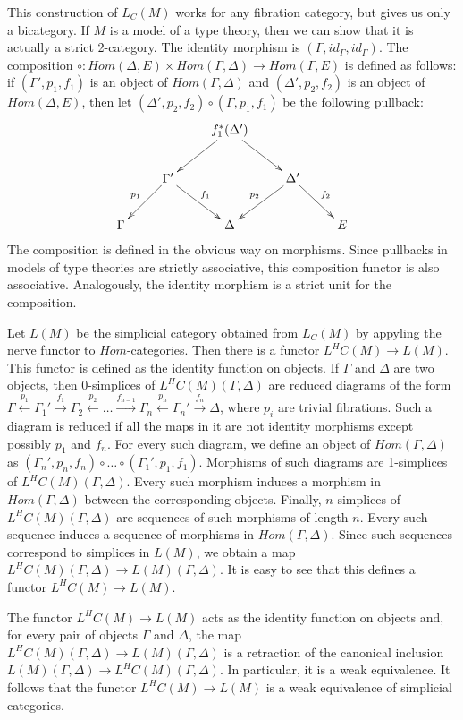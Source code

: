 \documentclass[reqno]{amsart}
\theoremstyle{definition}
\theoremstyle{remark}
\numberwithin{figure}{section}
\begin{document}
This construction of $L_C(M)$ works for any fibration category, but gives us only a bicategory.
If $M$ is a model of a type theory, then we can show that it is actually a strict 2-category.
The identity morphism is $(\Gamma,id_\Gamma,id_\Gamma)$.
The composition $\circ : Hom(\Delta,E) \times Hom(\Gamma,\Delta) \to Hom(\Gamma,E)$ is defined as follows:
if $(\Gamma',p_1,f_1)$ is an object of $Hom(\Gamma,\Delta)$ and $(\Delta',p_2,f_2)$ is an object of $Hom(\Delta,E)$,
then let $(\Delta',p_2,f_2) \circ (\Gamma,p_1,f_1)$ be the following pullback:
\[ \xymatrix{        &                                     & f_1^*(\Delta') \ar[dl] \ar[dr] &                                     & \\
                     & \Gamma' \ar[dl]_{p_1} \ar[dr]^{f_1} &                                & \Delta' \ar[dl]_{p_2} \ar[dr]^{f_2} & \\
              \Gamma &                                     & \Delta                         &                                     & E
            } \]
The composition is defined in the obvious way on morphisms.
Since pullbacks in models of type theories are strictly associative, this composition functor is also associative.
Analogously, the identity morphism is a strict unit for the composition.

Let $L(M)$ be the simplicial category obtained from $L_C(M)$ by appyling the nerve functor to $Hom$-categories.
Then there is a functor $L^H C(M) \to L(M)$.
This functor is defined as the identity function on objects.
If $\Gamma$ and $\Delta$ are two objects, then 0-simplices of $L^H C(M)(\Gamma,\Delta)$ are reduced diagrams of the form
$\Gamma \xleftarrow{p_1} \Gamma_1' \xrightarrow{f_1} \Gamma_2 \xleftarrow{p_2} \ldots \xrightarrow{f_{n-1}} \Gamma_n \xleftarrow{p_n} \Gamma_n' \xrightarrow{f_n} \Delta$,
where $p_i$ are trivial fibrations.
Such a diagram is reduced if all the maps in it are not identity morphisms except possibly $p_1$ and $f_n$.
For every such diagram, we define an object of $Hom(\Gamma,\Delta)$ as $(\Gamma_n',p_n,f_n) \circ \ldots \circ (\Gamma_1',p_1,f_1)$.
Morphisms of such diagrams are 1-simplices of $L^H C(M)(\Gamma,\Delta)$.
Every such morphism induces a morphism in $Hom(\Gamma,\Delta)$ between the corresponding objects.
Finally, $n$-simplices of $L^H C(M)(\Gamma,\Delta)$ are sequences of such morphisms of length $n$.
Every such sequence induces a sequence of morphisms in $Hom(\Gamma,\Delta)$.
Since such sequences correspond to simplices in $L(M)$, we obtain a map $L^H C(M)(\Gamma,\Delta) \to L(M)(\Gamma,\Delta)$.
It is easy to see that this defines a functor $L^H C(M) \to L(M)$.

The functor $L^H C(M) \to L(M)$ acts as the identity function on objects and, for every pair of objects $\Gamma$ and $\Delta$,
the map $L^H C(M)(\Gamma,\Delta) \to L(M)(\Gamma,\Delta)$ is a retraction of the canonical inclusion $L(M)(\Gamma,\Delta) \to L^H C(M)(\Gamma,\Delta)$.
In particular, it is a weak equivalence.
It follows that the functor $L^H C(M) \to L(M)$ is a weak equivalence of simplicial categories.



\end{document}
